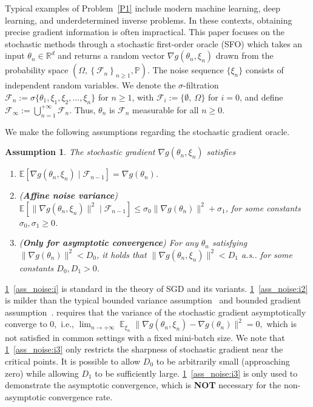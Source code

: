 \documentclass[standalone]{article}
\newcommand{\E}{\mathbb{E}}
\newcommand{\R}{\mathbb{R}}
\DeclareMathOperator{\Expect}{\mathbb{E}}
\newtheorem{assumpt}{Assumption}[section]
\begin{document}
Typical examples of Problem~\eqref{P1} include modern machine
learning, deep learning, and underdetermined inverse problems. In these contexts, obtaining precise gradient information is often impractical. This paper focuses on the stochastic methods through a stochastic first-order oracle (SFO) which takes an input $\theta_n \in \R^d$ and returns a random vector $\nabla g(\theta_n, \xi_n)$ drawn from the probability space $(\Omega, \left\lbrace\mathscr{F}_n \right\rbrace_{n\ge 1}, \mathbb{P})$. The noise sequence $\{\xi_{n}\}$ consists of independent random variables. We denote the $\sigma$-filtration $\mathscr{F}_{n}:=\sigma\{\theta_{1},\xi_{1},\xi_{2},...,\xi_{n}\}$ for $n\geq 1$,  with $\mathscr{F}_{i}:=\{\emptyset,\ \Omega\}$ for $i=0$, and  define $\mathscr{F}_{\infty}:=\bigcup_{n=1}^{+\infty}\mathscr{F}_{n}$. Thus, $\theta_n$ is $\mathscr{F}_n$ measurable for all $ n \geq 0$. 

We make the following assumptions regarding the stochastic gradient oracle.
\begin{assumpt}\label{ass_noise} The stochastic gradient $\nabla g(\theta_n, \xi_n)$ satisfies 
\begin{enumerate}[label=\textnormal{(\roman*)},leftmargin=*]
\item\label{ass_noise:i}  $\E \left[\nabla g(\theta_n, \xi_n) \mid \mathscr{F}_{n-1}\right] = \nabla g(\theta_n)$.
 \item\label{ass_noise:i2} (\textbf{Affine noise variance})   $\E\left[\big\|\nabla g(\theta_n,\xi_{n})\big\|^{2} \mid \mathscr{F}_{n-1}\right]\le \sigma_{0}\big\|\nabla g(\theta_n)\big\|^{2}+\sigma_{1}$, for some constants $\sigma_{0}, \sigma_{1} \geq 0$.
 \item\label{ass_noise:i3}(\textbf{Only for asymptotic convergence}) For any $\theta_n$ satisfying $\|\nabla g(\theta_{n})\|^{2}<D_0$, it holds that $\|\nabla g(\theta_{n},\xi_{n})\|^{2}< D_1$ a.s.. for some constants $D_0, D_1 >0$. 
\end{enumerate}
\end{assumpt}
\cref{ass_noise}~\ref{ass_noise:i} is standard in the theory of SGD and its variants. %
\cref{ass_noise}~\ref{ass_noise:i2} is milder than the typical bounded variance assumption~\citep{li2019convergence} and bounded gradient assumption~\citep{mertikopoulos2020almost,kavis2022high}. \cite{gadat2022asymptotic} requires that the variance of the stochastic gradient asymptotically converge to $0,$ i.e., $\lim_{n\rightarrow+\infty}\Expect_{\xi_{n}}\|\nabla g(\theta_{n},\xi_{n})-\nabla g(\theta_{n})\|^{2}=0,$ which is not satisfied in common settings with a fixed mini-batch size.  We note that \cref{ass_noise}~\ref{ass_noise:i3} only restricts the sharpness of stochastic gradient near the critical points. It is possible to allow $D_0$ to be arbitrarily small (approaching zero) while allowing $D_1$ to be sufficiently large. \cref{ass_noise}~\ref{ass_noise:i3} is only used to demonstrate the asymptotic convergence, which is \textbf{NOT} necessary for the non-asymptotic convergence rate.  
\end{document}
